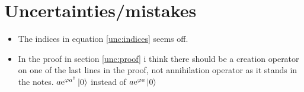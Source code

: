 \section{Uncertainties/mistakes}

\begin{itemize}
\item The indices in equation \eqref{unc:indices} seems off.  
\item In the proof in section \ref{unc:proof} i think there should be a creation operator on one of the last lines in the proof, not annihilation operator as it stands in the notes. $a\mathrm{e}^{\varphi a^\dagger}\ket{0}$ instead of $a\mathrm{e}^{\varphi a}\ket{0}$

\end{itemize}